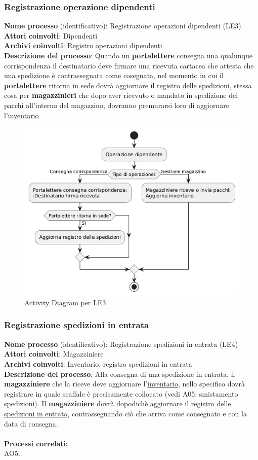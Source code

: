 \documentclass[a4paper,12pt]{article}
\begin{document}
\subsubsection{Registrazione operazione dipendenti}
\textbf{Nome processo} (identificativo): Registrazione operazioni dipendenti (LE3) \\
\textbf{Attori coinvolti}: Dipendenti \\
\textbf{Archivi coinvolti}: Registro operazioni dipendenti \\
\textbf{Descrizione del processo}: Quando un \textbf{portalettere} consegna una qualunque corrispondenza il destinatario deve firmare una ricevuta 
cartacea che attesta che una spedizione è contrassegnata come cosegnata, nel momento in cui il \textbf{portalettere} ritorna in sede dovrà aggiornare il 
\underline{registro delle spedizioni}, stessa cosa per \textbf{magazzinieri} che dopo aver ricevuto o mandato in spedizione dei pacchi all'interno del
magazzino, dovranno premurarsi loro di aggiornare l'\underline{inventario} \\ 
\begin{figure}[H]
	\centering
	\includegraphics[width=0.8\linewidth]{assets/activitydiagram_LE3.png}
	\caption{Activity Diagram per LE3}
\end{figure}

\newpage
\subsubsection{Registrazione spedizioni in entrata}
\textbf{Nome processo} (identificativo): Registrazione spedizioni in entrata (LE4) \\
\textbf{Attori coinvolti}: Magazziniere \\
\textbf{Archivi coinvolti}: Inventario, registro spedizioni in entrata \\
\textbf{Descrizione del processo}: Alla consegna di una spedizione in entrata, il \textbf{magazziniere} che la riceve deve aggiornare l'\underline{inventario}, 
nello specifico dovrà registrare in quale scaffale è precisamente collocato (vedi A05: smistamento spedizioni). Il \textbf{magazziniere} dovrà dopodichè aggiornare 
il \underline{registro delle spedizioni in entrata}, contrassegnando ciò che arriva come consegnato e con la data di consegna.\\ \\
\textbf{Processi correlati:}\\ AO5. \\ 
\end{document}
